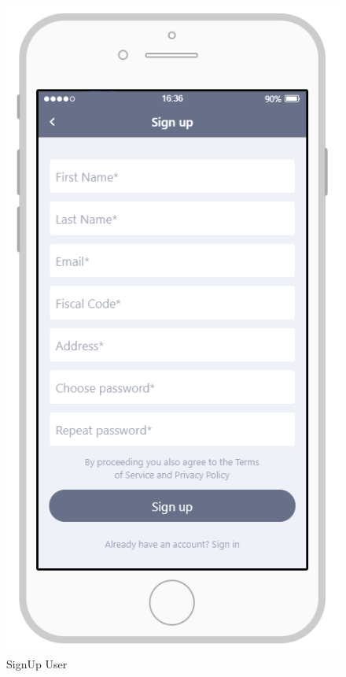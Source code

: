 \documentclass{article}
\begin{document}
\begin{figure}[H]
    \centering
    \includegraphics[scale=0.7]{Images/SignUpUtenteAPP}
    \caption{SignUp User}
\end{figure}
\end{document}
